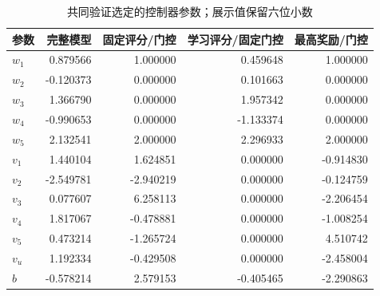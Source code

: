 \begin{table}[!htbp]
\centering\small
\caption{共同验证选定的控制器参数；展示值保留六位小数}
\label{tab:app-frozen-parameters}
\begin{tabular}{lrrrr}
\toprule
参数 & 完整模型 & 固定评分/门控 & 学习评分/固定门控 & 最高奖励/门控 \\
\midrule
$w_1$ & 0.879566 & 1.000000 & 0.459648 & 1.000000 \\
$w_2$ & -0.120373 & 0.000000 & 0.101663 & 0.000000 \\
$w_3$ & 1.366790 & 0.000000 & 1.957342 & 0.000000 \\
$w_4$ & -0.990653 & 0.000000 & -1.133374 & 0.000000 \\
$w_5$ & 2.132541 & 2.000000 & 2.296933 & 2.000000 \\
$v_1$ & 1.440104 & 1.624851 & 0.000000 & -0.914830 \\
$v_2$ & -2.549781 & -2.940219 & 0.000000 & -0.124759 \\
$v_3$ & 0.077607 & 6.258113 & 0.000000 & -2.206454 \\
$v_4$ & 1.817067 & -0.478881 & 0.000000 & -1.008254 \\
$v_5$ & 0.473214 & -1.265724 & 0.000000 & 4.510742 \\
$v_u$ & 1.192334 & -0.429508 & 0.000000 & -2.458004 \\
$b$ & -0.578214 & 2.579153 & -0.405465 & -2.290863 \\
\bottomrule
\end{tabular}
\par{}
\end{table}
